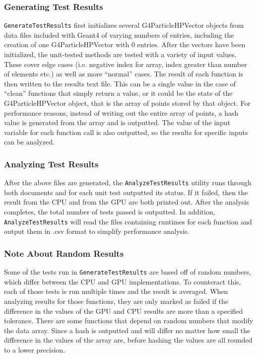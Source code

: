 \documentclass[12pt]{article}
\begin{document}
\subsubsection{Generating Test Results}
\texttt{GenerateTestResults} first initializes several G4ParticleHPVector objects from data files included with Geant4 of varying numbers of entries, including the creation of one G4ParticleHPVector with 0 entries. After the vectors have been initialized, the unit-tested methods are tested with a variety of input values. These cover edge cases (i.e. negative index for array, index greater than number of elements etc.) as well as more ``normal'' cases. The result of each function is then written to the results text file. This can be a single value in the case of ``clean'' functions that simply return a value, or it could be the state of the G4ParticleHPVector object, that is the array of points stored by that object. For performance reasons, instead of writing out the entire array of points, a hash value is generated from the array and is outputted. The value of the input variable for each function call is also outputted, so the results for specific inputs can be analyzed.

\subsubsection{Analyzing Test Results}
After the above files are generated, the \texttt{AnalyzeTestResults} utility runs through both documents and for each unit test outputted its status. If it failed, then the result from the CPU and from the GPU are both printed out. After the analysis completes, the total number of tests passed is outputted. In addition, \texttt{AnalyzeTestResults} will read the files containing runtimes for each function and output them in .csv format to simplify performance analysis.

\subsubsection{Note About Random Results}
Some of the tests run in \texttt{GenerateTestResults} are based off of random numbers, which differ between the CPU and GPU implementations. To counteract this, each of those tests is run multiple times and the result is averaged. When analyzing results for those functions, they are only marked as failed if the difference in the values of the GPU and CPU results are more than a specified tolerance. There are some functions that depend on random numbers that modify the data array. Since a hash is outputted and will differ no matter how small the difference in the values of the array are, before hashing the values are all rounded to a lower precision.
\end{document}
